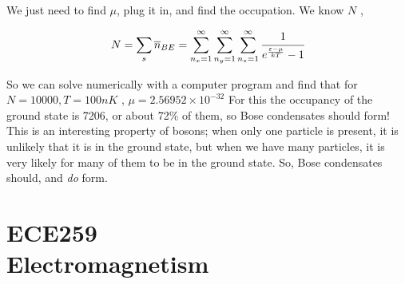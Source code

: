 \documentclass[10pt]{article}
\begin{document}
We just need to find $ \mu $, plug it in, and find the occupation.
We know $ N $ , 

\begin{equation}
	N = \sum_s \overline{n}_{BE} =
		\sum^\infty_{n_x = 1}
		\sum^\infty_{n_y = 1}
		\sum^\infty_{n_z = 1}
		\cfrac{1}{e^{\frac{\varepsilon - \mu}{kT}} - 1}
\end{equation}

So we can solve numerically with a computer program and find that for $ N = 10000, T=100nK$ , $ \mu = 2.56952 \times  10^{-32}$ 
For this the occupancy of the ground state is 7206, or about 72\% of them, so Bose condensates should form!
This is an interesting property of bosons; when only one particle is present, it is unlikely that it is in the ground state, but when we have many particles, it is very likely for many of them to be in the ground state.
So, Bose condensates should, and \textit{do} form. 
































\newpage
\part{ECE259\texorpdfstring{\\}.Electromagnetism}
\end{document}
